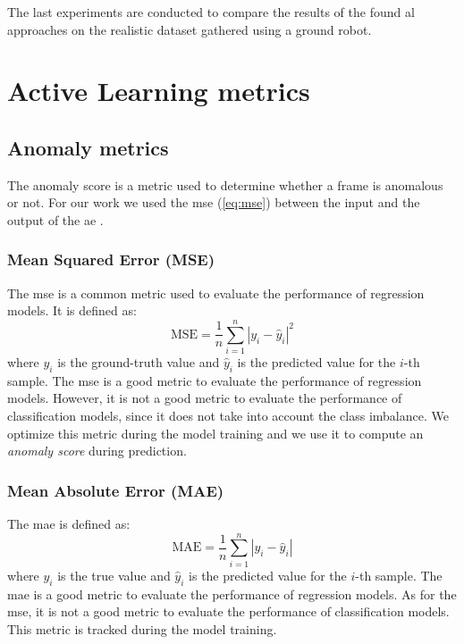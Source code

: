     The last experiments are conducted to compare the results of the found \acrshort{al} approaches on the realistic dataset gathered using a ground robot.

\section{Active Learning metrics}
    \subsection{Anomaly metrics}
    \label{sec:anomaly-metrics}

    The anomaly score is a metric used to determine whether a frame is anomalous or not. For our work we used the \acrshort{mse} (\autoref{eq:mse}) between the input and the output of the \acrshort{ae} \cite{sakurada2014anomaly}.
    
    \subsubsection{Mean Squared Error (MSE)}
    The \acrfull{mse} is a common metric used to evaluate the performance of regression models. It is defined as:
    \begin{equation}
        \text{MSE} = \frac{1}{n} \sum_{i=1}^{n} |y_i - \hat{y}_i|^2
        \label{eq:mse}
    \end{equation}
    where $y_i$ is the ground-truth value and $\hat{y}_i$ is the predicted value for the $i$-th sample. The \acrshort{mse} is a good metric to evaluate the performance of regression models. However, it is not a good metric to evaluate the performance of classification models, since it does not take into account the class imbalance. We optimize this metric during the model training and we use it to compute an \emph{anomaly score} during prediction.

    \subsubsection{Mean Absolute Error (MAE)}
    The \acrfull{mae} is defined as:
    \begin{equation}
        \text{MAE} = \frac{1}{n} \sum_{i=1}^{n} |y_i - \hat{y}_i|
        \label{eq:mae}
    \end{equation}
    where $y_i$ is the true value and $\hat{y}_i$ is the predicted value for the $i$-th sample. The \acrshort{mae} is a good metric to evaluate the performance of regression models. As for the \acrshort{mse}, it is not a good metric to evaluate the performance of classification models. This metric is tracked during the model training.

